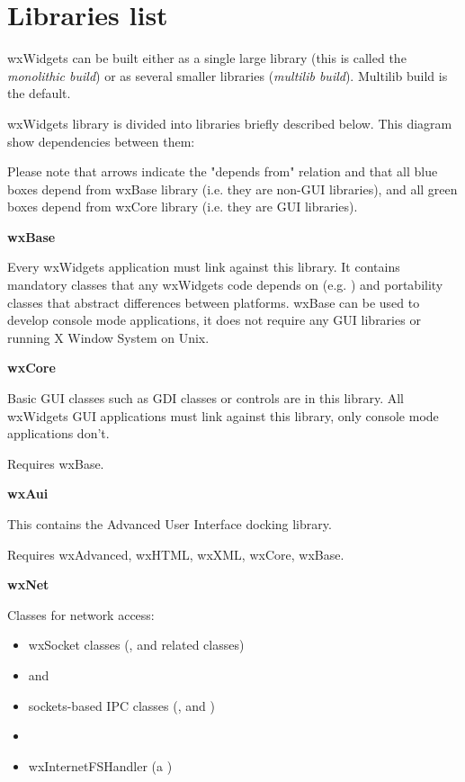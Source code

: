 \chapter{Libraries list}\label{librarieslist}
%
\setfooter{\thepage}{}{}{}{}{\thepage}%

wxWidgets can be built either as a single large
library (this is called the {\it monolithic build}) or as several smaller
libraries ({\it multilib build}). Multilib build is the default.

wxWidgets library is divided into libraries briefly described below. This
diagram show dependencies between them:

\begin{center}
\end{center}

Please note that arrows indicate the "depends from" relation and that
all blue boxes depend from wxBase library (i.e. they are non-GUI libraries), and
all green boxes depend from wxCore library (i.e. they are GUI libraries).

{\large {\bf wxBase}}

Every wxWidgets application must link against this library. It contains
mandatory classes that any wxWidgets code depends on (e.g.
 ) and portability classes that abstract
differences between platforms. wxBase can be used to develop console mode
applications, it does not require any GUI libraries or running X Window System
on Unix.

{\large {\bf wxCore}}

Basic GUI classes such as GDI classes or controls are in this library. All
wxWidgets GUI applications must link against this library, only console mode
applications don't.

Requires wxBase.

{\large {\bf wxAui}}

This contains the Advanced User Interface docking library.

Requires wxAdvanced, wxHTML, wxXML, wxCore, wxBase.

{\large {\bf wxNet}}

Classes for network access:

\begin{itemize}
\item{ wxSocket classes (,
  and related classes) }
\item{  and
  }
\item{ sockets-based IPC classes (,
  and
 ) }
\item{  }
\item{ wxInternetFSHandler (a ) }
\end{itemize}

